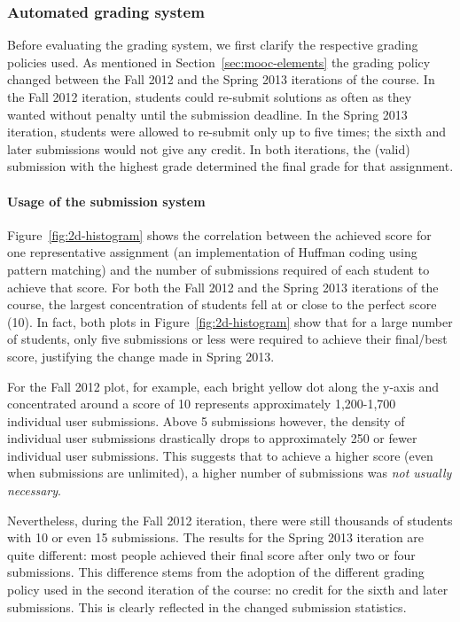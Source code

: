 \documentclass{sig-alternate}
\begin{document}
\subsubsection{Automated grading system}

Before evaluating the grading system, we first clarify the respective grading
policies used. As mentioned in Section~\ref{sec:mooc-elements} the grading
policy changed between the Fall 2012 and the Spring 2013 iterations of the
course. In the Fall 2012 iteration, students could re-submit solutions as
often as they wanted without penalty until the submission deadline. In the
Spring 2013 iteration, students were allowed to re-submit only up to five
times; the sixth and later submissions would not give any credit. In both
iterations, the (valid) submission with the highest grade determined the final
grade for that assignment.

\paragraph{Usage of the submission system}

Figure~\ref{fig:2d-histogram} shows the correlation between the achieved
score for one representative assignment (an implementation of Huffman coding using
pattern matching) and the number of submissions required of each student to achieve that
score. For both the Fall 2012 and the Spring 2013 iterations of the course,
the largest concentration of students fell at or close to the perfect score
(10). In fact, both plots in Figure~\ref{fig:2d-histogram} show that
for a large number of students, only five submissions or less were required to
achieve their final/best score, justifying the change made in Spring 2013.

For the Fall 2012 plot, for example, each bright yellow dot
along the y-axis and concentrated around a score of 10 represents approximately 1,200-1,700
individual user submissions. Above 5 submissions however, the density of individual user submissions
drastically drops to approximately 250 or fewer individual user submissions.
This suggests that to achieve a higher score (even when submissions are unlimited),
a higher number of submissions was {\em not usually necessary}.

Nevertheless, during the Fall 2012 iteration, there were still thousands of students
with 10 or even 15 submissions. The results for the Spring 2013 iteration are
quite different: most people achieved their final score after only two or four
submissions. This difference stems from the adoption of the different grading policy used in
the second iteration of the course: no credit for
the sixth and later submissions. This is clearly reflected in the changed
submission statistics.
\end{document}
